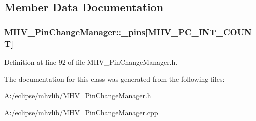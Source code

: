 \subsection{\-Member \-Data \-Documentation}
\hypertarget{class_m_h_v___pin_change_manager_afe6febbf14bb802401734219ef6b2eec}{
\subsubsection[{\-\_\-pins}]{ {\bf \-M\-H\-V\-\_\-\-Pin\-Change\-Manager\-::\-\_\-pins}\mbox{[}\-M\-H\-V\-\_\-\-P\-C\-\_\-\-I\-N\-T\-\_\-\-C\-O\-U\-N\-T\mbox{]}}}
\label{class_m_h_v___pin_change_manager_afe6febbf14bb802401734219ef6b2eec}


\-Definition at line 92 of file \-M\-H\-V\-\_\-\-Pin\-Change\-Manager.\-h.



\-The documentation for this class was generated from the following files\-:\begin{DoxyCompactItemize}
\item 
\-A\-:/eclipse/mhvlib/\hyperlink{_m_h_v___pin_change_manager_8h}{\-M\-H\-V\-\_\-\-Pin\-Change\-Manager.\-h}\item 
\-A\-:/eclipse/mhvlib/\hyperlink{_m_h_v___pin_change_manager_8cpp}{\-M\-H\-V\-\_\-\-Pin\-Change\-Manager.\-cpp}\end{DoxyCompactItemize}
